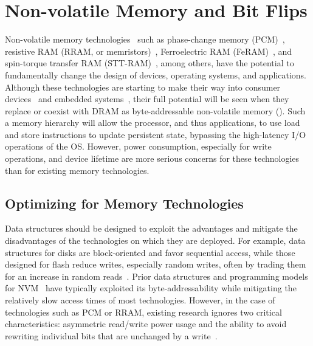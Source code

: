 
\section{Non-volatile Memory and Bit Flips}
\label{sec:background}


Non-volatile memory technologies~\cite{burr:ibmjrd08} such as phase-change memory
(PCM)~\cite{lee_architecting_2009}, resistive RAM (RRAM, or
memristors)~\cite{strukov:nature08,shen:dtc11}, Ferroelectric RAM
(FeRAM)~\cite{fox:2001feram}, and spin-torque transfer RAM
(STT-RAM)~\cite{sttram}, among others, have the potential to fundamentally
change the design of devices, operating systems, and applications. Although
these technologies are starting to make their way into consumer
devices~\cite{intel3dxpoint} and embedded systems~\cite{shen:dtc11}, their full
potential will be seen when they replace or coexist with DRAM as
byte-addressable non-volatile memory (\NVM). Such a memory hierarchy will allow
the processor, and thus applications, to use load and store instructions to
update persistent state, bypassing the high-latency I/O operations of the
OS. However, power consumption, especially for write operations,
and device lifetime are more serious concerns for these technologies than
for existing memory technologies.

\subsection{Optimizing for Memory Technologies}

Data structures should be designed to exploit the advantages and mitigate the
disadvantages of the technologies on which they are deployed.  For example, data
structures for disks are block-oriented and favor sequential access, while those
designed for flash reduce writes, especially random writes, often by trading them for an increase in
random reads~\cite{colgrove:sigmod15}.  Prior data structures and programming
models for
NVM~\cite{xu:fast16,meza:weed13,greenan:hotdep07,volos:asplos11,coburn:asplos11,condit:sosp09}
have typically exploited its byte-addressability while mitigating the relatively
slow access times of most \NVM technologies.  However, in the case of
technologies such as PCM or RRAM, existing research ignores two critical
characteristics: asymmetric read/write power usage and the ability to avoid
rewriting individual bits that are unchanged by a
write~\cite{burr:ibmjrd08,yang:iscas07}.

